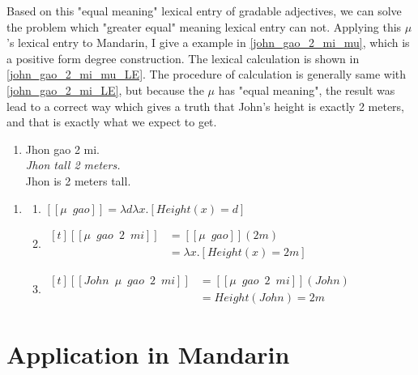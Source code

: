 \documentclass{ctexart}
\begin{document}
Based on this "equal meaning" lexical entry of gradable adjectives, we can solve the problem which "greater equal" meaning lexical entry can not. Applying this $\mu$'s lexical entry to Mandarin, I give a example in \ref{john_gao_2_mi_mu}, which is a positive form degree construction. The lexical calculation is shown in \ref{john_gao_2_mi_mu_LE}. The procedure of calculation is generally same with \ref{john_gao_2_mi_LE}, but because the $\mu$ has "equal meaning", the result was lead to a correct way which gives a truth that John's height is exactly 2 meters, and that is exactly what we expect to get.

\begin{enumerate}[resume]
    \item \label{john_gao_2_mi_mu} 
    Jhon gao 2 mi. \\
    \textit{Jhon tall 2 meters.} \\
    Jhon is 2 meters tall.
\end{enumerate}

\begin{enumerate}[resume]
    \item \label{john_gao_2_mi_mu_LE}
    
    \begin{enumerate}[ref=(\arabic{enumi}\alph*)]
    \item
    $[\![\mu \enspace gao]\!] = \lambda d \lambda x.[Height(x) = d]$
    
    \item
    $\begin{aligned}[t]
        [\![\mu \enspace gao \enspace 2 \enspace mi]\!] &= [\![\mu \enspace gao]\!](2m) \\
        &= \lambda x.[Height(x) = 2m]
    \end{aligned}$
    
    \item
    $\begin{aligned}[t]
        [\![John \enspace \mu \enspace gao \enspace 2 \enspace mi]\!] &= [\![\mu \enspace gao \enspace 2 \enspace mi]\!](John) \\
        &= Height(John) = 2m
    \end{aligned}$
    
    \end{enumerate}
\end{enumerate}


\section{Application in Mandarin}
\end{document}
